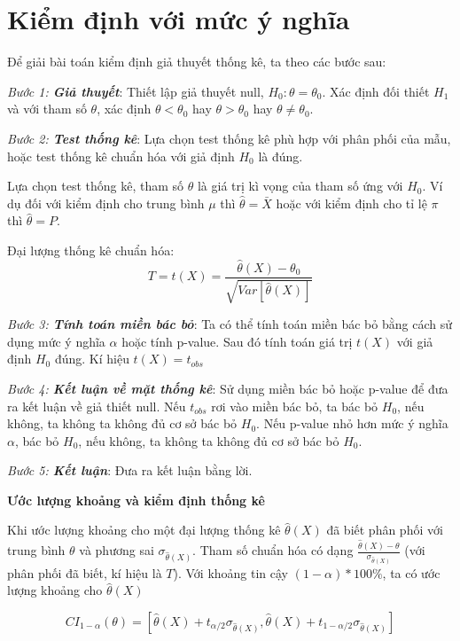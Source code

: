 \section{Kiểm định với mức ý nghĩa}
Để giải bài toán kiểm định giả thuyết thống kê, ta theo các bước sau:

\textit{Bước 1: \textbf{Giả thuyết}}:
Thiết lập giả thuyết null, $H_0: \theta = \theta_0$. Xác định đối thiết $H_1$ và với tham số $\theta$,
xác định $\theta < \theta_0$ hay $\theta > \theta_0$ hay $\theta \neq \theta_0$.

\textit{Bước 2: \textbf{Test thống kê}}:
Lựa chọn test thống kê phù hợp với phân phối của mẫu, hoặc test thống kê chuẩn hóa với 
giả định $H_0$ là đúng.

Lựa chọn test thống kê, tham số $\hat{\theta}$ là giá trị kì vọng của tham số ứng với $H_0$.
Ví dụ đối với kiểm định cho trung bình $\mu$ thì $\hat{\theta} = \bar{X}$ hoặc
với kiểm định cho tỉ lệ $\pi$ thì $\hat{\theta} = P$.

Đại lượng thống kê chuẩn hóa:
\begin{equation}
	T = t(X) = \frac{\hat{\theta}(X) - \theta_0}{\sqrt{Var[\hat{\theta}(X)]}}
\end{equation}

\textit{Bước 3: \textbf{Tính toán miền bác bỏ}}:
Ta có thể tính toán miền bác bỏ bằng cách sử dụng mức ý nghĩa $\alpha$ hoặc tính p-value.
Sau đó tính toán giá trị $t(X)$ với giả định $H_0$ đúng. Kí hiệu $t(X) = t_{obs}$

\textit{Bước 4: \textbf{Kết luận về mặt thống kê}}:
Sử dụng miền bác bỏ hoặc p-value để đưa ra kết luận về giả thiết null. Nếu $t_{obs}$
rơi vào miền bác bỏ, ta bác bỏ $H_0$, nếu không, ta không ta không đủ cơ sở bác bỏ $H_0$.
Nếu p-value nhỏ hơn mức ý nghĩa $\alpha$, bác bỏ $H_0$, nếu không, ta không ta không đủ cơ sở bác bỏ $H_0$.

\textit{Bước 5: \textbf{Kết luận}}:
Đưa ra kết luận bằng lời.

\textbf{Ước lượng khoảng và kiểm định thống kê}

Khi ước lượng khoảng cho một đại lượng thống kê $\hat{\theta}(X)$ đã biết phân phối
với trung bình $\theta$ và phương sai $\sigma_{\hat{\theta}(X)}$. Tham số chuẩn hóa 
có dạng $\frac{\hat{\theta}(X) - \theta}{\sigma_{\hat{\theta}(X)}}$ (với phân phối đã biết, 
kí hiệu là $T$). Với khoảng tin cậy $(1 - \alpha) * 100\%$, ta có ước lượng khoảng cho $\hat{\theta}(X)$

\begin{equation}
	CI_{1- \alpha}(\theta) = [\hat{\theta}(X) + t_{\alpha/2} \sigma_{\hat{\theta}(X)}, 
	\hat{\theta}(X) + t_{1 - \alpha/2} \sigma_{\hat{\theta}(X)}]
\end{equation}

